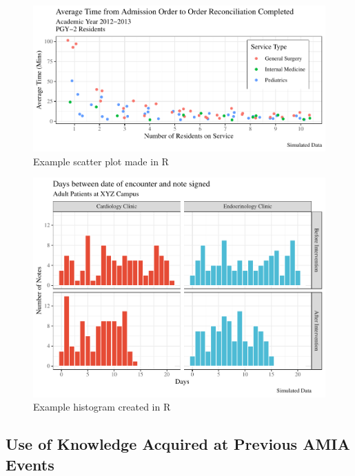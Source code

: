 \documentclass[
]{article}
\begin{document}
\begin{figure}

{\centering \includegraphics{qi_workshop_files/figure-latex/scatter-1} 

}

\caption{Example scatter plot made in R}\label{fig:scatter}
\end{figure}

\begin{figure}

{\centering \includegraphics{qi_workshop_files/figure-latex/histo-1} 

}

\caption{Example histogram created in R}\label{fig:histo}
\end{figure}

\hypertarget{use-of-knowledge-acquired-at-previous-amia-events}{%
\subsection{Use of Knowledge Acquired at Previous AMIA Events}\label{use-of-knowledge-acquired-at-previous-amia-events}}
\end{document}
